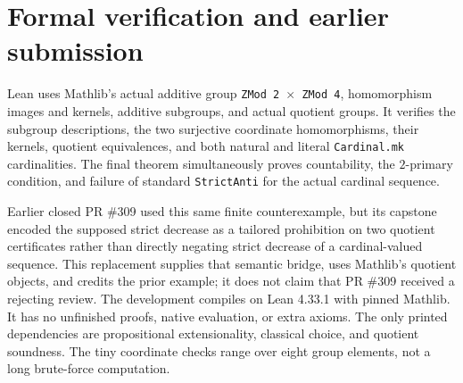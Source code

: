 \documentclass[10pt]{article}
\begin{document}
\section*{Formal verification and earlier submission}
Lean uses Mathlib's actual additive group \texttt{ZMod 2 $\times$ ZMod 4},
homomorphism images and kernels, additive subgroups, and actual quotient
groups. It verifies the subgroup descriptions, the two surjective
coordinate homomorphisms, their kernels, quotient equivalences, and
both natural and literal \texttt{Cardinal.mk} cardinalities.
The final theorem simultaneously proves countability, the $2$-primary
condition, and failure of standard \texttt{StrictAnti} for the actual
cardinal sequence.

Earlier closed PR \#309 used this same finite counterexample, but its
capstone encoded the supposed strict decrease as a tailored prohibition
on two quotient certificates rather than directly negating strict
decrease of a cardinal-valued sequence. This replacement supplies that
semantic bridge, uses Mathlib's quotient objects, and credits the prior
example; it does not claim that PR \#309 received a rejecting review.
The development compiles on Lean 4.33.1 with pinned Mathlib. It has no
unfinished proofs, native evaluation, or extra axioms. The only printed
dependencies are propositional extensionality, classical choice, and
quotient soundness. The tiny coordinate checks range over eight group
elements, not a long brute-force computation.
\end{document}
